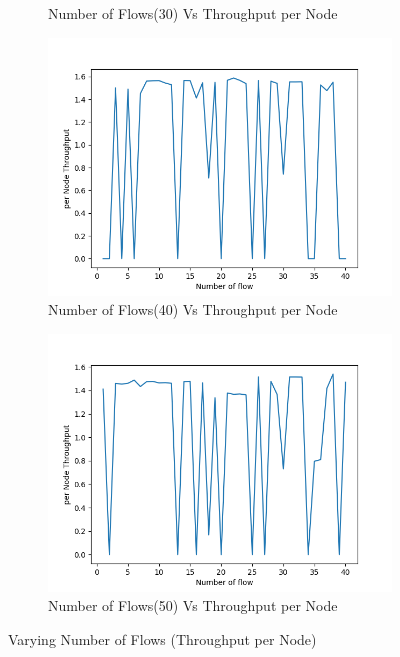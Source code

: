\begin{figure}[h]
\begin{subfigure}{.5\textwidth}
         \caption{Number of Flows(30) Vs Throughput per Node}
        \end{subfigure}
\begin{subfigure}{.5\textwidth}
    \centering
    \includegraphics[width=.8\linewidth]{_15_4_static/NumberofFlow(40)vsperNodeThroughput.png}
         \caption{Number of Flows(40) Vs Throughput per Node}
        \end{subfigure}
\begin{subfigure}{.5\textwidth}
    \centering
    \includegraphics[width=.8\linewidth]{_15_4_static/NumberofFlow(50)vsperNodeThroughput.png}
         \caption{Number of Flows(50) Vs Throughput per Node}
        \end{subfigure}
\caption{Varying Number of Flows (Throughput per Node)}
\label{flow_per_node_throughput}
\end{figure}

